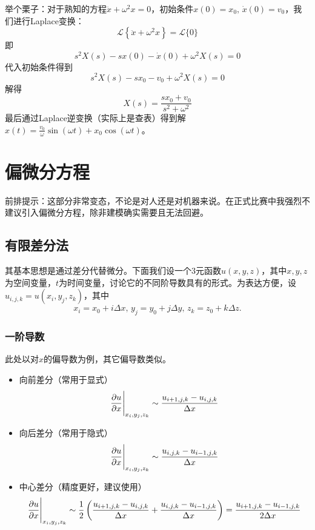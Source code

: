 \documentclass[a4paper, 12pt]{article}
\begin{document}
    举个栗子：对于熟知的方程$\ddot x+\omega^2x=0$，初始条件$x(0)=x_0,\,\dot x(0)=v_0$，我们进行Laplace变换：
    \[
    \mathcal L\left\{\ddot x+\omega^2x\right\} = \mathcal L\{0\}
    \]
    即
    \[
    s^2X(s) - sx(0) - \dot x(0) + \omega^2X(s) = 0
    \]
    代入初始条件得到
    \[
    s^2X(s) - sx_0 - v_0 + \omega^2X(s) = 0
    \]
    解得
    \[
    X(s) = \frac{sx_0 + v_0}{s^2 + \omega^2}
    \]
    最后通过Laplace逆变换（实际上是查表）得到解$x(t)=\frac{v_0}{\omega}\sin(\omega t)+x_0\cos(\omega t)$。

    \section{偏微分方程}
	
    前排提示：这部分非常变态，不论是对人还是对机器来说。在正式比赛中我强烈不建议引入偏微分方程，除非建模确实需要且无法回避。

    \subsection{有限差分法}

    其基本思想是通过差分代替微分。下面我们设一个3元函数$u(x,y,z)$，其中$x,y,z$为空间变量，$t$为时间变量，讨论它的不同阶导数具有的形式。为表达方便，设$u_{i,j,k}=u(x_i,y_j,z_k)$，其中
    \[
    x_i=x_0+i\Delta x,\,y_j=y_0+j\Delta y,\,z_k=z_0+k\Delta z.
    \]

    \subsubsection{一阶导数}

    此处以对$x$的偏导数为例，其它偏导数类似。

    \begin{itemize}
        \item 向前差分（常用于显式）
        \[
        \frac{\partial u}{\partial x}\Bigg{|}_{x_i,y_j,z_k}\sim\frac{u_{i+1,j,k}-u_{i,j,k}}{\Delta x}
        \]
        \item 向后差分（常用于隐式）
        \[
        \frac{\partial u}{\partial x}\Bigg{|}_{x_i,y_j,z_k}\sim\frac{u_{i,j,k}-u_{i-1,j,k}}{\Delta x}
        \]
        \item 中心差分（精度更好，建议使用）
        \[
        \frac{\partial u}{\partial x}\Bigg{|}_{x_i,y_j,z_k}\sim\frac{1}{2}\left(\frac{u_{i+1,j,k}-u_{i,j,k}}{\Delta x}+\frac{u_{i,j,k}-u_{i-1,j,k}}{\Delta x}\right)=\frac{u_{i+1,j,k}-u_{i-1,j,k}}{2\Delta x}
        \]
    \end{itemize}
\end{document}
